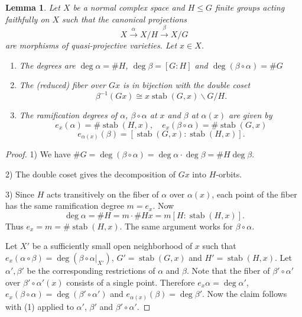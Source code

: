 \documentclass{amsart}
\theoremstyle{definition}
\theoremstyle{plain}
\newtheorem{lemma}[definition]{Lemma}
\DeclareMathOperator{\stab}{stab}
\newcommand{\simon}[1]{\textcolor{magenta}{#1}}
\begin{document}
 \begin{lemma}\label{lem:quotients}
 Let $X$ be a normal complex space and $H \leq G$ finite groups acting faithfully on $X$ such that the canonical projections
\[X \xrightarrow{\alpha} X/H \xrightarrow{\beta}  X/G\]
are morphisms of quasi-projective varieties.
Let $x \in X$.
\begin{enumerate}
    \item The degrees are $\deg \alpha = \#H$, $\deg \beta= [G:H]$ and $\deg (\beta\circ\alpha) = \#G$
    \item The (reduced) fiber over $Gx$ is in bijection with the double coset
\[\beta^{-1}(Gx) \cong  x \stab(G,x) \backslash G /H . \]
\item The ramification degrees of $\alpha$, $\beta\circ\alpha$ at $x$ and $\beta$ at $\alpha(x)$
are given by
\[e_{x}(\alpha) = \#\stab(H,x), \quad e_x(\beta\circ\alpha) = \# \stab(G,x)\]
\[e_{\alpha(x)}(\beta) = \left[\stab(G,x): \stab(H,x)\right].\]
 \end{enumerate}
 \end{lemma}
 \begin{proof}
 1) We have $\# G = \deg (\beta \circ \alpha)  = \deg \alpha \cdot \deg \beta = \# H \deg \beta$.

 2) The double coset gives the decomposition of $G x$ into $H$-orbits.

 3) %
Since $H$ acts transitively on the fiber of $\alpha$ over $\alpha(x)$, each point of the fiber has the same ramification degree $m=e_x$. Now
\[\deg \alpha = \# H = m \cdot \# H x = m [H : \stab(H,x)].\]
Thus $e_x=m=\# \stab(H,x)$. The same argument works for $\beta\circ \alpha$.

Let $X'$ be a sufficiently small open neighborhood of $x$ such that $e_x(\alpha\circ\beta) = \deg (\beta\circ\alpha|_{X'})$, $G'=\stab(G,x)$ and $H'=\stab(H,x)$. Let $\alpha',\beta'$ be the corresponding restrictions of $\alpha$ and $\beta$.
Note that the fiber of $\beta'\circ\alpha'$ over $\beta'\circ\alpha'(x)$ consists of a single point. Therefore
$e_{x}\alpha=\deg \alpha'$, $e_x(\beta\circ\alpha)=\deg( \beta'\circ\alpha')$ and $e_{\alpha(x)}(\beta)=\deg \beta'$.
Now the claim follows with (1) applied to $\alpha'$, $\beta'$ and $\beta'\circ\alpha'$.
\end{proof}
\end{document}
